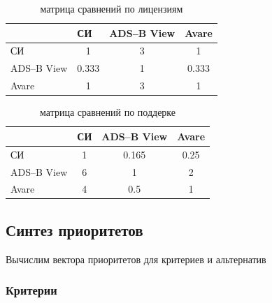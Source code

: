 \documentclass[a4paper,12pt]{report} %
\begin{document}
\begin{table}
  \caption{матрица сравнений по лицензиям}
  \begin{tabular}{l|c|c|c|}
    \cline{2-4}
    {}                               & \multicolumn{1}{l|}{СИ}        & \multicolumn{1}{l|}{ADS--B View} & \multicolumn{1}{l|}{Avare} \\ \hline
    \multicolumn{1}{|l|}{СИ}         & 1                              & 3                               & 1                          \\ \hline
    \multicolumn{1}{|l|}{ADS--B View} & 0.333                          & 1                               & 0.333                      \\ \hline
    \multicolumn{1}{|l|}{Avare}      & 1                              & 3                               & 1                          \\ \hline
  \end{tabular}
\end{table}

\begin{table}
  \caption{матрица сравнений по поддерке}
  \begin{tabular}{l|c|c|c|}
    \cline{2-4}
    {}                               & \multicolumn{1}{l|}{СИ}        & \multicolumn{1}{l|}{ADS--B View} & \multicolumn{1}{l|}{Avare} \\ \hline
    \multicolumn{1}{|l|}{СИ}         & 1                              & 0.165                           & 0.25                       \\ \hline
    \multicolumn{1}{|l|}{ADS--B View} & 6                              & 1                               & 2                          \\ \hline
    \multicolumn{1}{|l|}{Avare}      & 4                              & 0.5                             & 1                          \\ \hline
  \end{tabular}
\end{table}
\subsection{Синтез приоритетов}

Вычислим вектора приоритетов для критериев и альтернатив

\subsubsection{Критерии}
\end{document}
